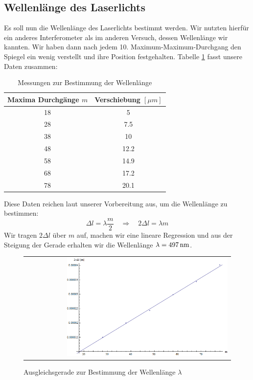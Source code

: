 \documentclass[a4paper,titlepage]{scrartcl}
\numberwithin{equation}{section}
\begin{document}
\subsection{Wellenlänge des Laserlichts}
Es soll nun die Wellenlänge des Laserlichts bestimmt werden. Wir nutzten hierfür ein anderes Interferometer als im anderen Versuch, dessen Wellenlänge wir kannten. Wir haben dann nach  jedem 10. Maximum-Maximum-Durchgang den Spiegel ein wenig verstellt und ihre Position festgehalten. Tabelle \ref{tab:aufgabe22} fasst unsere Daten zusammen:
\begin{table}[H]
\begin{tabular}{c|c}
	Maxima Durchgänge $m$ & Verschiebung $[\mu m]$ \\
	\hline
	18 & 5 \\
	28 & 7.5 \\
	38 & 10 \\
	48 & 12.2 \\
	58 & 14.9 \\
	68 & 17.2 \\
	78 & 20.1 \\
\end{tabular}
\caption{Messungen zur Bestimmung der Wellenlänge}
\label{tab:aufgabe22}
\end{table}
Diese Daten reichen laut unserer Vorbereitung aus, um die Wellenlänge zu bestimmen:
\begin{equation}
\Delta l = \lambda \frac{m}{2} \quad \Rightarrow \quad 2 \Delta l = \lambda m
\end{equation}
Wir tragen $2 \Delta l$ über $m$ auf, machen wir eine lineare Regression und aus der Steigung der Gerade erhalten wir die Wellenlänge $\lambda=\unit[497]{nm}$.
\begin{figure}[H]
	\centering
	\begin{tabular}{@{}r@{}}
		\includegraphics[width=0.8\textwidth]{bilder/aufgabe22.png}\\
	\end{tabular}
	\caption{Ausgleichsgerade zur Bestimmung der Wellenlänge $\lambda$}
	\label{fig:aufgabe22}
\end{figure}
\end{document}
